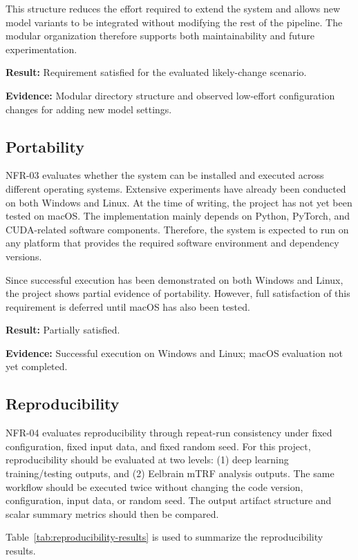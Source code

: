 \documentclass[12pt, titlepage]{article}
\begin{document}
This structure reduces the effort required to extend the system and allows new model variants to be integrated without modifying the rest of the pipeline.
The modular organization therefore supports both maintainability and future experimentation.

\textbf{Result:} Requirement satisfied for the evaluated likely-change scenario.

\textbf{Evidence:} Modular directory structure and observed low-effort configuration changes for adding new model settings.

\subsection{Portability}

NFR-03 evaluates whether the system can be installed and executed across different operating systems. 
Extensive experiments have already been conducted on both Windows and Linux.
At the time of writing, the project has not yet been tested on macOS.
The implementation mainly depends on Python, PyTorch, and CUDA-related software components.
Therefore, the system is expected to run on any platform that provides the required software environment and dependency versions.

Since successful execution has been demonstrated on both Windows and Linux, the project shows partial evidence of portability.
However, full satisfaction of this requirement is deferred until macOS has also been tested.

\textbf{Result:} Partially satisfied.

\textbf{Evidence:} Successful execution on Windows and Linux; macOS evaluation not yet completed.

\subsection{Reproducibility}

NFR-04 evaluates reproducibility through repeat-run consistency under fixed configuration, fixed input data, and fixed random seed. 
For this project, reproducibility should be evaluated at two levels:
(1) deep learning training/testing outputs, and
(2) Eelbrain mTRF analysis outputs.
The same workflow should be executed twice without changing the code version, configuration, input data, or random seed.
The output artifact structure and scalar summary metrics should then be compared.

Table~\ref{tab:reproducibility-results} is used to summarize the reproducibility results.
\end{document}
